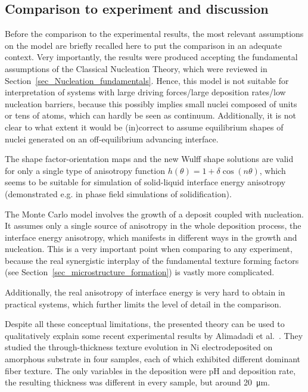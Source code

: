 	\subsection{Comparison to experiment and discussion}\label{sec_MC_to_experiment}
	Before the comparison to the experimental results, the most relevant assumptions on the model are briefly recalled here to put the comparison in an adequate context. Very importantly, the results were produced accepting the fundamental assumptions of the Classical Nucleation Theory, which were reviewed in Section~\ref{sec_Nucleation_fundamentals}. Hence, this model is not suitable for interpretation of systems with large driving forces/large deposition rates/low nucleation barriers, because this possibly implies small nuclei composed of units or tens of atoms, which can hardly be seen as continuum. Additionally, it is not clear to what extent it would be (in)correct to assume equilibrium shapes of nuclei generated on an off-equilibrium advancing interface.
	
	The shape factor-orientation maps and the new Wulff shape solutions are valid for only a single type of anisotropy function $h(\theta)=1+\delta\cos(n\theta)$, which seems to be suitable for simulation of solid-liquid interface energy anisotropy (demonstrated e.g. in phase field simulations of solidification). 
	
	The Monte Carlo model involves the growth of a deposit coupled with nucleation. It assumes only a single source of anisotropy in the whole deposition process, the interface energy anisotropy, which manifests in different ways in the growth and nucleation. This is a very important point when comparing to any experiment, because the real synergistic interplay of the fundamental texture forming factors (see Section~\ref{sec_microstructure_formation}) is vastly more complicated.
	
	Additionally, the real anisotropy of interface energy is very hard to obtain in practical systems, which further limits the level of detail in the comparison. 
	
	Despite all these conceptual limitations, the presented theory can be used to qualitatively explain some recent experimental results by Alimadadi et al.~\cite{Alimadadi2016}. They studied the through-thickness texture evolution in Ni electrodeposited on amorphous substrate in four samples, each of which exhibited different dominant fiber texture. The only variables in the deposition were pH and deposition rate, the resulting thickness was different in every sample, but around \qty{20}{\um}. 
	
